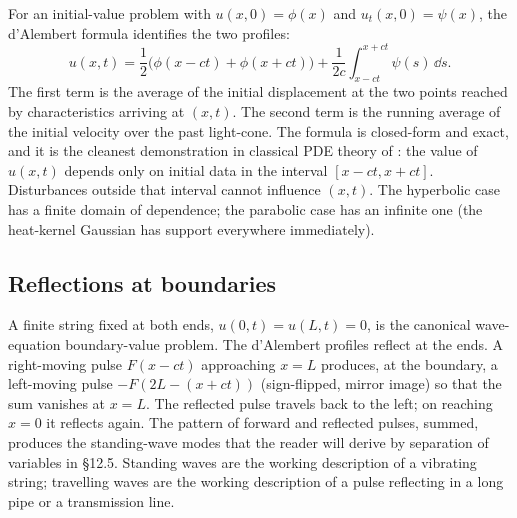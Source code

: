 For an initial-value problem with $u(x, 0) = \phi(x)$ and
$u_{t}(x, 0) = \psi(x)$, the d'Alembert formula identifies the
two profiles:
\[
u(x, t) = \frac{1}{2}\bigl(\phi(x - c t) + \phi(x + c t)\bigr) + \frac{1}{2 c} \int_{x - c t}^{x + c t} \psi(s)\, \dd s.
\]
The first term is the average of the initial displacement at the
two points reached by characteristics arriving at $(x, t)$. The
second term is the running average of the initial velocity over
the past light-cone. The formula is closed-form and exact, and it
is the cleanest demonstration in classical PDE theory of
: the value of $u(x, t)$
depends only on initial data in the interval $[x - c t, x + c t]$.
Disturbances outside that interval cannot influence $(x, t)$. The
hyperbolic case has a finite domain of dependence; the parabolic
case has an infinite one (the heat-kernel Gaussian has support
everywhere immediately).

\subsection{Reflections at boundaries}

A finite string fixed at both ends, $u(0, t) = u(L, t) = 0$, is
the canonical wave-equation boundary-value problem. The
d'Alembert profiles reflect at the ends. A right-moving pulse $F(x
- c t)$ approaching $x = L$ produces, at the boundary, a
left-moving pulse $-F(2 L - (x + c t))$ (sign-flipped, mirror
image) so that the sum vanishes at $x = L$. The reflected pulse
travels back to the left; on reaching $x = 0$ it reflects again.
The pattern of forward and reflected pulses, summed, produces the
standing-wave modes that the reader will derive by separation of
variables in §12.5. Standing waves are the working description of
a vibrating string; travelling waves are the working description
of a pulse reflecting in a long pipe or a transmission line.

